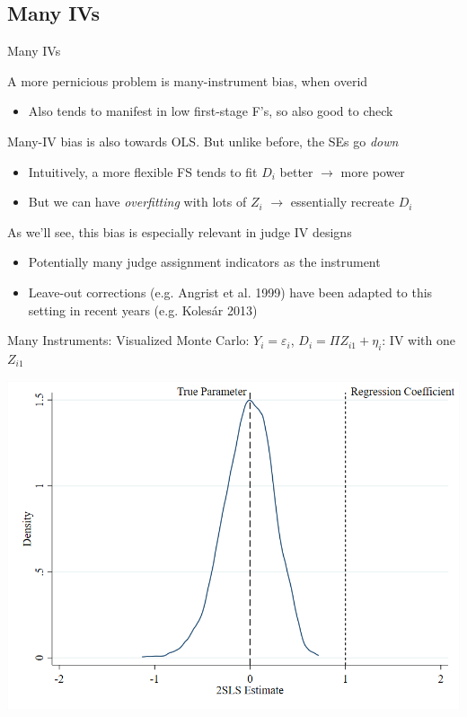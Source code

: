\documentclass{beamer}
\begin{document}
\subsection{Many IVs}
\begin{frame}{Many IVs}

A more pernicious problem is many-instrument bias, when overid\smallskip
\begin{itemize}
\item Also tends to manifest in low first-stage F's, so also good to check
\end{itemize}\bigskip\pause{}

Many-IV bias is also towards OLS. But unlike before, the SEs go \emph{down}\smallskip
\begin{itemize}
  \item Intuitively, a more flexible FS tends to fit $D_i$ better $\rightarrow$ more power\smallskip
  \item But we can have \emph{overfitting} with lots of $Z_i$ $\rightarrow$ essentially recreate $D_i$
\end{itemize}\bigskip\pause{}

As we'll see, this bias is especially relevant in judge IV designs\smallskip
\begin{itemize}
  \item Potentially many judge assignment indicators as the instrument\smallskip
  \item Leave-out corrections (e.g. Angrist et al. 1999) have been adapted to this setting in recent years (e.g. Koles\'{a}r 2013)
\end{itemize}

\end{frame}

\begin{frame}{Many Instruments: Visualized}
\vspace{-0.2cm}
Monte Carlo: $Y_i=\varepsilon_i$, $D_i=\Pi Z_{i1}+\eta_i$: IV with one $Z_{i1}$
\begin{center}
\includegraphics[scale=0.35]{./lecture_includes/fewz.png}
\end{center}

\end{frame}
\end{document}
